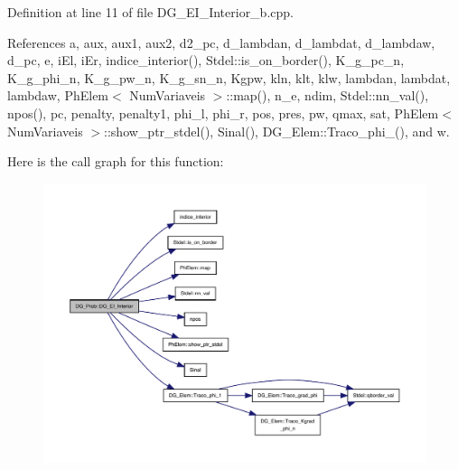 Definition at line 11 of file D\+G\+\_\+\+E\+I\+\_\+\+Interior\+\_\+b.\+cpp.



References a, aux, aux1, aux2, d2\+\_\+pc, d\+\_\+lambdan, d\+\_\+lambdat, d\+\_\+lambdaw, d\+\_\+pc, e, i\+El, i\+Er, indice\+\_\+interior(), Stdel\+::is\+\_\+on\+\_\+border(), K\+\_\+g\+\_\+pc\+\_\+n, K\+\_\+g\+\_\+phi\+\_\+n, K\+\_\+g\+\_\+pw\+\_\+n, K\+\_\+g\+\_\+sn\+\_\+n, Kgpw, kln, klt, klw, lambdan, lambdat, lambdaw, Ph\+Elem$<$ Num\+Variaveis $>$\+::map(), n\+\_\+e, ndim, Stdel\+::nn\+\_\+val(), npos(), pc, penalty, penalty1, phi\+\_\+l, phi\+\_\+r, pos, pres, pw, qmax, sat, Ph\+Elem$<$ Num\+Variaveis $>$\+::show\+\_\+ptr\+\_\+stdel(), Sinal(), D\+G\+\_\+\+Elem\+::\+Traco\+\_\+phi\+\_(), and w.

Here is the call graph for this function\+:
\nopagebreak
\begin{figure}[H]
\begin{center}
\leavevmode
\includegraphics[width=350pt]{classDG__Prob_ac3054c910c2a6465c71f208b0e2b79ff_cgraph}
\end{center}
\end{figure}
\mbox{\label{classDG__Prob_a5aa1654fb60cabf97719e65ba9302cf4}} 

